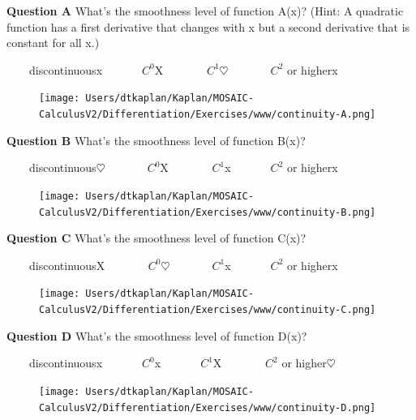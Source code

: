 \documentclass[
  letterpaper,
  DIV=11,
  numbers=noendperiod,
  oneside]{article}
\begin{document}
\begin{multicols}{2}
\textbf{Question A} What's the smoothness level of function A(x)? (Hint:
A quadratic function has a first derivative that changes with x but a
second derivative that is constant for all x.)

~~~~{discontinuous{x}}~~~~~~~{\(C^0\){︎X
}}~~~~~~~{\(C^1\){\(\heartsuit\ \)}}~~~~~~~{\(C^2\) or higher{x}}

\begin{figure}

{\centering \texttt{[image: Users/dtkaplan/Kaplan/MOSAIC-CalculusV2/Differentiation/Exercises/www/continuity-A.png]}

}

\end{figure}

\textbf{Question B} What's the smoothness level of function B(x)?

~~~~{discontinuous{\(\heartsuit\ \)}}~~~~~~~{\(C^0\){︎X
}}~~~~~~~{\(C^1\){x}}~~~~~~~{\(C^2\) or higher{x}}

\begin{figure}

{\centering \texttt{[image: Users/dtkaplan/Kaplan/MOSAIC-CalculusV2/Differentiation/Exercises/www/continuity-B.png]}

}

\end{figure}

\textbf{Question C} What's the smoothness level of function C(x)?

~~~~{discontinuous{︎X
}}~~~~~~~{\(C^0\){\(\heartsuit\ \)}}~~~~~~~{\(C^1\){x}}~~~~~~~{\(C^2\)
or higher{x}}

\begin{figure}

{\centering \texttt{[image: Users/dtkaplan/Kaplan/MOSAIC-CalculusV2/Differentiation/Exercises/www/continuity-C.png]}

}

\end{figure}

\textbf{Question D} What's the smoothness level of function D(x)?

~~~~{discontinuous{x}}~~~~~~~{\(C^0\){x}}~~~~~~~{\(C^1\){︎X
}}~~~~~~~{\(C^2\) or higher{\(\heartsuit\ \)}}

\begin{figure}

{\centering \texttt{[image: Users/dtkaplan/Kaplan/MOSAIC-CalculusV2/Differentiation/Exercises/www/continuity-D.png]}

}


\end{figure}
\end{multicols}
\end{document}
